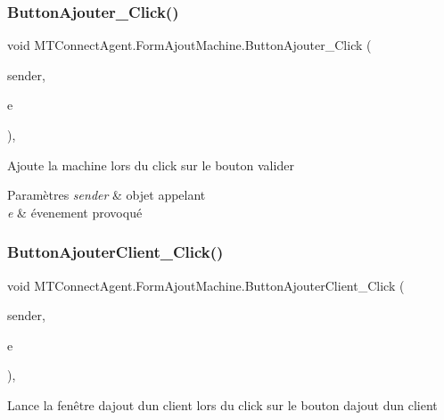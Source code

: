 \subsubsection{\texorpdfstring{Button\+Ajouter\+\_\+\+Click()}{ButtonAjouter\_Click()}}
{\footnotesize\ttfamily void M\+T\+Connect\+Agent.\+Form\+Ajout\+Machine.\+Button\+Ajouter\+\_\+\+Click (\begin{DoxyParamCaption}\item[{object}]{sender,  }\item[{Event\+Args}]{e }\end{DoxyParamCaption})\hspace{0.3cm}{\ttfamily [inline]}, {\ttfamily [private]}}



Ajoute la machine lors du click sur le bouton valider 


\begin{DoxyParams}{Paramètres}
{\em sender} & objet appelant\\
\hline
{\em e} & évenement provoqué\\
\hline
\end{DoxyParams}
\mbox{\label{class_m_t_connect_agent_1_1_form_ajout_machine_a2db9bc636b698deb1ae1aec251862360}} 
\subsubsection{\texorpdfstring{Button\+Ajouter\+Client\+\_\+\+Click()}{ButtonAjouterClient\_Click()}}
{\footnotesize\ttfamily void M\+T\+Connect\+Agent.\+Form\+Ajout\+Machine.\+Button\+Ajouter\+Client\+\_\+\+Click (\begin{DoxyParamCaption}\item[{object}]{sender,  }\item[{Event\+Args}]{e }\end{DoxyParamCaption})\hspace{0.3cm}{\ttfamily [inline]}, {\ttfamily [private]}}



Lance la fenêtre d\textquotesingle{}ajout d\textquotesingle{}un client lors du click sur le bouton d\textquotesingle{}ajout d\textquotesingle{}un client 


